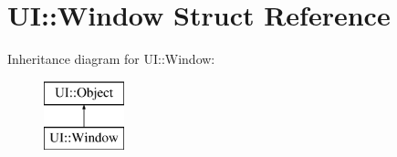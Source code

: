 \hypertarget{struct_u_i_1_1_window}{}\section{UI\+:\+:Window Struct Reference}
\label{struct_u_i_1_1_window}
Inheritance diagram for UI\+:\+:Window\+:\begin{figure}[H]
\begin{center}
\leavevmode
\includegraphics[height=2.000000cm]{struct_u_i_1_1_window}
\end{center}
\end{figure}
